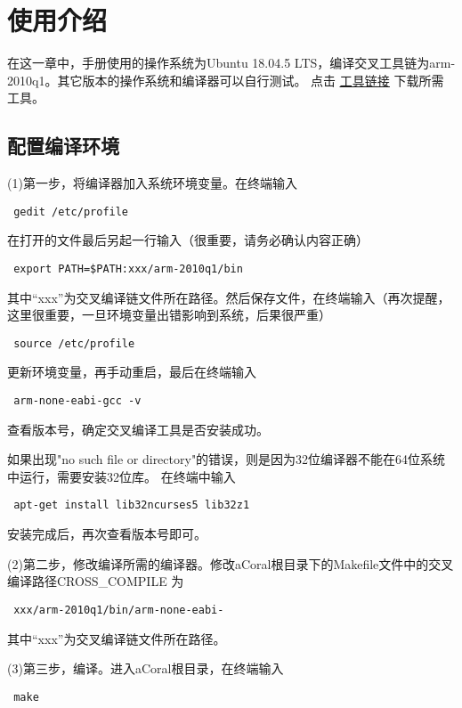 \chapter{使用介绍}

在这一章中，手册使用的操作系统为Ubuntu 18.04.5 LTS，编译交叉工具链为arm-2010q1。其它版本的操作系统和编译器可以自行测试。
点击 \href{https://github.com/spg-one/aCoral1-Tools}{\underline{工具链接}} 下载所需工具。

\section{配置编译环境}

(1)第一步，将编译器加入系统环境变量。在终端输入
\begin{lstlisting}
 gedit /etc/profile   
\end{lstlisting}

在打开的文件最后另起一行输入（很重要，请务必确认内容正确）
\begin{lstlisting}
 export PATH=$PATH:xxx/arm-2010q1/bin  
\end{lstlisting}

其中“xxx”为交叉编译链文件所在路径。然后保存文件，在终端输入（再次提醒，这里很重要，一旦环境变量出错影响到系统，后果很严重）
\begin{lstlisting}
 source /etc/profile
\end{lstlisting}

更新环境变量，再手动重启，最后在终端输入
\begin{lstlisting}
 arm-none-eabi-gcc -v
\end{lstlisting}

查看版本号，确定交叉编译工具是否安装成功。

如果出现"no such file or directory"的错误，则是因为32位编译器不能在64位系统中运行，需要安装32位库。
在终端中输入
\begin{lstlisting}
 apt-get install lib32ncurses5 lib32z1
\end{lstlisting}

安装完成后，再次查看版本号即可。

(2)第二步，修改编译所需的编译器。修改aCoral根目录下的Makefile文件中的交叉编译路径CROSS\_COMPILE 为
\begin{lstlisting}
 xxx/arm-2010q1/bin/arm-none-eabi-
\end{lstlisting}

其中“xxx”为交叉编译链文件所在路径。

(3)第三步，编译。进入aCoral根目录，在终端输入
\begin{lstlisting}
 make
\end{lstlisting}

